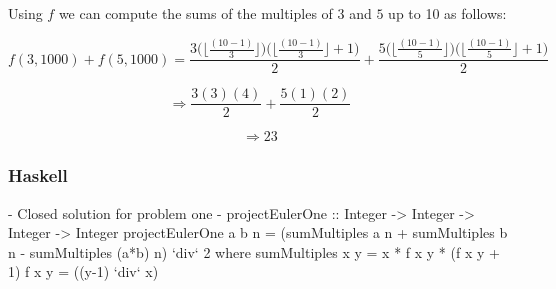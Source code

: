 \documentclass[11pt,a4paper]{report}
\begin{document}
                    Using $f$ we can compute the sums of the multiples of $3$ and $5$ up to 10 as follows:
                    
                    \[ f(3,1000) + f(5,1000) =
                        \frac{3 \Big(\Big\lfloor \frac{(10 - 1)}{3} \Big\rfloor \Big) 
                        \Big(\Big\lfloor \frac{(10 - 1)}{3} \Big\rfloor + 1 \Big)}{2}                        
                        +                        
                        \frac{5 \Big(\Big\lfloor \frac{(10 - 1)}{5} \Big\rfloor \Big) 
                        \Big(\Big\lfloor \frac{(10 - 1)}{5} \Big\rfloor + 1 \Big)}{2}  \]
		            
		            \[ \Rightarrow \frac{3(3)(4)}{2} + \frac{5(1)(2)}{2}\]

                    \[ \Rightarrow 23 \]

    		        \subsubsection{Haskell}
    		        
	                	\begin{haskellCode}
{-
    Closed solution for problem one
-}
projectEulerOne :: Integer -> Integer -> Integer -> Integer
projectEulerOne a b n = (sumMultiples a n  + sumMultiples b n  
                            - sumMultiples (a*b) n) `div` 2
        where sumMultiples x y = x * f x y * (f x y + 1)
              f x y = ((y-1) `div` x)
                        \end{haskellCode}		            
	
\end{document}

